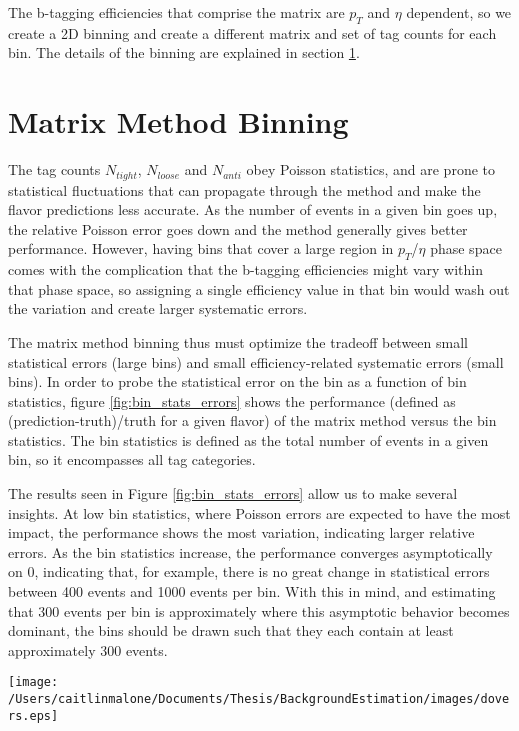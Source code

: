 The b-tagging efficiencies that comprise the matrix are $p_T$ and $\eta$ dependent, so we create a 2D binning and create a different matrix and set of tag counts for each bin.  The details of the binning are explained in section \ref{sec:matrix_method_binning}.


\section{Matrix Method Binning} \label{sec:matrix_method_binning}
The tag counts $N_{tight}$, $N_{loose}$ and $N_{anti}$ obey Poisson statistics, and are prone to statistical fluctuations that can propagate through the method and make the flavor predictions less accurate.  As the number of events in a given bin goes up, the relative Poisson error goes down and the method generally gives better performance.  However, having bins that cover a large region in $p_T$/$\eta$ phase space comes with the complication that the b-tagging efficiencies might vary within that phase space, so assigning a single efficiency value in that bin would wash out the variation and create larger systematic errors.

The matrix method binning thus must optimize the tradeoff between small statistical errors (large bins) and small efficiency-related systematic errors (small bins).  In order to probe the statistical error on the bin as a function of bin statistics, figure \ref{fig:bin_stats_errors} shows the performance (defined as (prediction-truth)/truth for a given flavor) of the matrix method versus the bin statistics.  The bin statistics is defined as the total number of events in a given bin, so it encompasses all tag categories.

The results seen in Figure \ref{fig:bin_stats_errors} allow us to make several insights.  At low bin statistics, where Poisson errors are expected to have the most impact, the performance shows the most variation, indicating larger relative errors.  As the bin statistics increase, the performance converges asymptotically on 0, indicating that, for example, there is no great change in statistical errors between 400 events and 1000 events per bin.  With this in mind, and estimating that 300 events per bin is approximately where this asymptotic behavior becomes dominant, the bins should be drawn such that they each contain at least approximately 300 events.

\texttt{[image: /Users/caitlinmalone/Documents/Thesis/BackgroundEstimation/images/dovers.eps]}
\label{fig:bin_stats_errors}

